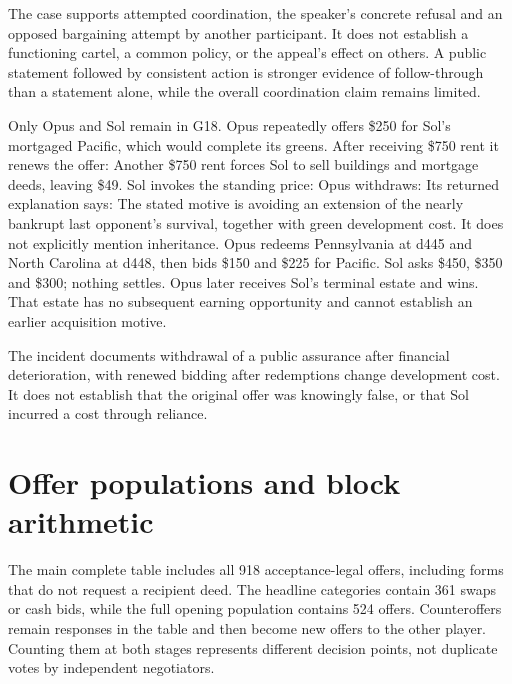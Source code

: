 The case supports attempted coordination, the speaker's concrete refusal and an opposed bargaining attempt by another participant. It does not establish a functioning cartel, a common policy, or the appeal's effect on others. A public statement followed by consistent action is stronger evidence of follow-through than a statement alone, while the overall coordination claim remains limited.

Only Opus and Sol remain in G18. Opus repeatedly offers \$250 for Sol's mortgaged Pacific, which would complete its greens. After receiving \$750 rent it renews the offer:
Another \$750 rent forces Sol to sell buildings and mortgage deeds, leaving \$49. Sol invokes the standing price:
Opus withdraws:
Its returned explanation says:
The stated motive is avoiding an extension of the nearly bankrupt last opponent's survival, together with green development cost. It does not explicitly mention inheritance. Opus redeems Pennsylvania at d445 and North Carolina at d448, then bids \$150 and \$225 for Pacific. Sol asks \$450, \$350 and \$300; nothing settles. Opus later receives Sol's terminal estate and wins. That estate has no subsequent earning opportunity and cannot establish an earlier acquisition motive.

The incident documents withdrawal of a public assurance after financial deterioration, with renewed bidding after redemptions change development cost. It does not establish that the original offer was knowingly false, or that Sol incurred a cost through reliance.

\section{Offer populations and block arithmetic}
\label{app:offers}
The main complete table includes all 918 acceptance-legal offers, including forms that do not request a recipient deed. The headline categories contain 361 swaps or cash bids, while the full opening population contains 524 offers. Counteroffers remain responses in the table and then become new offers to the other player. Counting them at both stages represents different decision points, not duplicate votes by independent negotiators.

